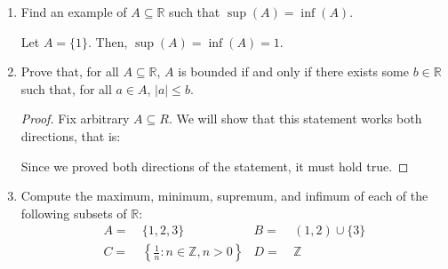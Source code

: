 \documentclass{article}
\begin{document}
\begin{enumerate}
        \item Find an example of $A \subseteq \mathbb{R}$ such that $\sup(A) = \inf(A)$. \par
            \quad Let $A = \{ 1 \}$. Then, $\sup(A) = \inf(A) = 1$.

        \item Prove that, for all $A \subseteq \mathbb{R}$, $A$ is bounded if and only if there exists some $b \in \mathbb{R}$ such that, for all $a \in A$, $|a| \leq b$.
            \begin{proof}
                Fix arbitrary $A \subseteq R$. We will show that this statement works both directions, that is:
                \begin{caseof}
                \end{caseof}
                Since we proved both directions of the statement, it must hold true.
            \end{proof}

        \item Compute the maximum, minimum, supremum, and infimum of each of the following subsets of $\mathbb{R}$:
    	\begin{align*}
    		A = & \ \{ 1, 2, 3 \} & B = & \ (1, 2) \cup \{ 3 \} \\
    		C = & \ \left\{ \frac{1}{n} : n \in \mathbb{Z}, n > 0 \right\} & D = & \ \mathbb{Z}
    	\end{align*}


\end{enumerate}
\end{document}
